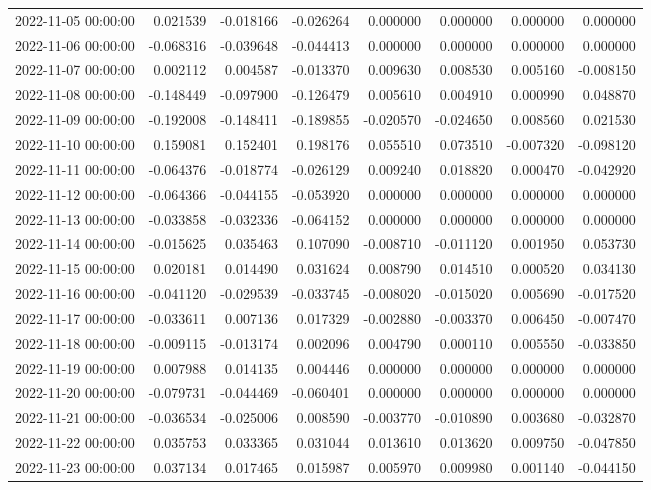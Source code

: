 \begin{tabular}{lrrrrrrr}
2022-11-05 00:00:00 & 0.021539 & -0.018166 & -0.026264 & 0.000000 & 0.000000 & 0.000000 & 0.000000 \\
2022-11-06 00:00:00 & -0.068316 & -0.039648 & -0.044413 & 0.000000 & 0.000000 & 0.000000 & 0.000000 \\
2022-11-07 00:00:00 & 0.002112 & 0.004587 & -0.013370 & 0.009630 & 0.008530 & 0.005160 & -0.008150 \\
2022-11-08 00:00:00 & -0.148449 & -0.097900 & -0.126479 & 0.005610 & 0.004910 & 0.000990 & 0.048870 \\
2022-11-09 00:00:00 & -0.192008 & -0.148411 & -0.189855 & -0.020570 & -0.024650 & 0.008560 & 0.021530 \\
2022-11-10 00:00:00 & 0.159081 & 0.152401 & 0.198176 & 0.055510 & 0.073510 & -0.007320 & -0.098120 \\
2022-11-11 00:00:00 & -0.064376 & -0.018774 & -0.026129 & 0.009240 & 0.018820 & 0.000470 & -0.042920 \\
2022-11-12 00:00:00 & -0.064366 & -0.044155 & -0.053920 & 0.000000 & 0.000000 & 0.000000 & 0.000000 \\
2022-11-13 00:00:00 & -0.033858 & -0.032336 & -0.064152 & 0.000000 & 0.000000 & 0.000000 & 0.000000 \\
2022-11-14 00:00:00 & -0.015625 & 0.035463 & 0.107090 & -0.008710 & -0.011120 & 0.001950 & 0.053730 \\
2022-11-15 00:00:00 & 0.020181 & 0.014490 & 0.031624 & 0.008790 & 0.014510 & 0.000520 & 0.034130 \\
2022-11-16 00:00:00 & -0.041120 & -0.029539 & -0.033745 & -0.008020 & -0.015020 & 0.005690 & -0.017520 \\
2022-11-17 00:00:00 & -0.033611 & 0.007136 & 0.017329 & -0.002880 & -0.003370 & 0.006450 & -0.007470 \\
2022-11-18 00:00:00 & -0.009115 & -0.013174 & 0.002096 & 0.004790 & 0.000110 & 0.005550 & -0.033850 \\
2022-11-19 00:00:00 & 0.007988 & 0.014135 & 0.004446 & 0.000000 & 0.000000 & 0.000000 & 0.000000 \\
2022-11-20 00:00:00 & -0.079731 & -0.044469 & -0.060401 & 0.000000 & 0.000000 & 0.000000 & 0.000000 \\
2022-11-21 00:00:00 & -0.036534 & -0.025006 & 0.008590 & -0.003770 & -0.010890 & 0.003680 & -0.032870 \\
2022-11-22 00:00:00 & 0.035753 & 0.033365 & 0.031044 & 0.013610 & 0.013620 & 0.009750 & -0.047850 \\
2022-11-23 00:00:00 & 0.037134 & 0.017465 & 0.015987 & 0.005970 & 0.009980 & 0.001140 & -0.044150 \\

\end{tabular}
